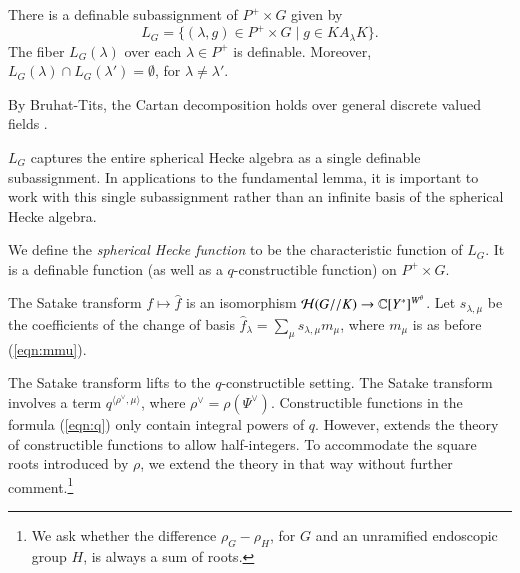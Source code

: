 \begin{lemma} \label{lemma:cartan}
  There is a definable subassignment of $P^+\times G$ given by 
\[
L_G = \{(\lambda,g)\in P^+\times G \mid g \in K A_\lambda K \}.
\]
The fiber $L_G(\lambda)$ over each $\lambda\in P^+$ is definable.
Moreover, $L_G(\lambda)\cap L_G(\lambda') = \emptyset$, for
$\lambda\ne \lambda'$.
\end{lemma}

By Bruhat-Tits, the Cartan decomposition holds over general discrete valued
fields \cite[4.4.3]{bruhat1972groupes}.

\begin{remark}   
  $L_G$ captures the entire spherical Hecke algebra as a single
  definable subassignment.  In applications to the fundamental lemma,
  it is important to work with this single subassignment rather than
  an infinite basis of the spherical Hecke algebra.
\end{remark}

We define the {\it spherical Hecke function} to be the characteristic
function of $L_G$.  It is a definable function (as well as a  $q$-constructible function) on
$P^+\times G$.


The Satake transform $f\mapsto \hat f$ is an
isomorphism $\mathcal H(G//K)\to\mathbb{C}[Y^*]^{W^\theta}$.  Let
$s_{\lambda,\mu}$ be the coefficients of the change of basis $\hat
f_\lambda = \sum_\mu s_{\lambda,\mu} m_\mu$,
where $m_\mu$ is as before (\ref{eqn:mmu}).

The Satake transform lifts to the $q$-constructible setting.  The
Satake transform involves a term $q^{\langle\rho^\vee,\mu\rangle}$,
where $\rho^\vee = \rho(\Psi^\vee)$.  Constructible functions in the
formula (\ref{eqn:q}) only contain integral powers of $q$.  However,
\cite[\S B.3.1]{cluckers2011local} extends the theory of constructible
functions to allow half-integers.  To accommodate the square roots
introduced by $\rho$, we extend the theory in that way without further
comment.\footnote{We ask whether the difference $\rho_G - \rho_H$,
  for $G$ and an unramified endoscopic group $H$, is always a sum of
  roots.}

